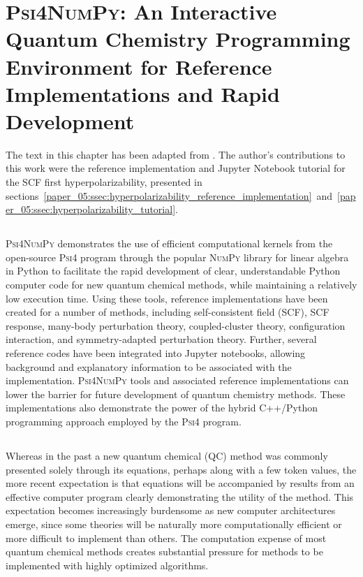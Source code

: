 \newcommand{\numpy}{\textsc{NumPy}\xspace}
\newcommand{\pfour}{\textsc{Psi4}\xspace}
\newcommand{\pfn}{\textsc{Psi4NumPy}\xspace}
\newcommand{\arrayint}{\texttt{array\_interface}\xspace}
\newcommand{\einsum}{\texttt{einsum}\xspace}

\chapter[\pfn]{\pfn: An Interactive Quantum Chemistry Programming Environment for Reference Implementations and Rapid Development}
\label{ch:paper_05}

The text in this chapter has been adapted from . The author's contributions to this work were the reference implementation and Jupyter Notebook tutorial for the SCF first hyperpolarizability, presented in sections~\ref{paper_05:ssec:hyperpolarizability_reference_implementation}~and~\ref{paper_05:ssec:hyperpolarizability_tutorial}.

\section{\texorpdfstring{}{Summary}}

\pfn demonstrates the use of efficient computational kernels from the open-source \pfour program through the popular \numpy library for linear algebra in Python to facilitate the rapid development of clear, understandable Python computer code for new quantum chemical methods, while maintaining a relatively low execution time.  Using these tools, reference implementations have been created for a number of methods, including self-consistent field (SCF), SCF response, many-body perturbation theory, coupled-cluster theory, configuration interaction, and symmetry-adapted perturbation theory.  Further, several reference codes have been integrated into Jupyter notebooks, allowing background and explanatory information to be associated with the implementation.  \pfn tools and associated reference implementations can lower the barrier for future development of quantum chemistry methods.  These implementations also demonstrate the power of the hybrid C++/Python programming approach employed by the \pfour program.

\section{\texorpdfstring{}{Introduction}}

Whereas in the past a new quantum chemical (QC) method was commonly presented solely through its equations, perhaps along with a few token values, the more recent expectation is that equations will be accompanied by results from an effective computer program clearly demonstrating the utility of the method.  This expectation becomes increasingly burdensome as new computer architectures emerge, since some theories will be naturally more computationally efficient or more difficult to implement than others.  The computation expense of most quantum chemical methods creates substantial pressure for methods to be implemented with highly optimized algorithms.

